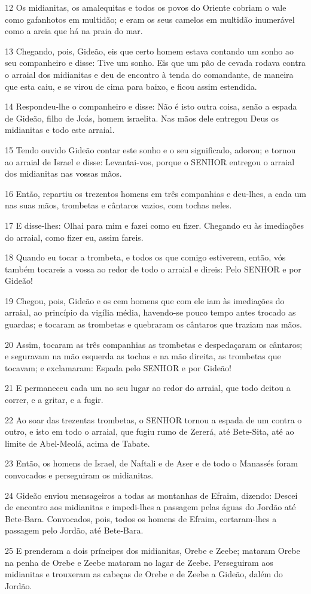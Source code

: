 \par 12 Os midianitas, os amalequitas e todos os povos do Oriente cobriam o vale como gafanhotos em multidão; e eram os seus camelos em multidão inumerável como a areia que há na praia do mar.
\par 13 Chegando, pois, Gideão, eis que certo homem estava contando um sonho ao seu companheiro e disse: Tive um sonho. Eis que um pão de cevada rodava contra o arraial dos midianitas e deu de encontro à tenda do comandante, de maneira que esta caiu, e se virou de cima para baixo, e ficou assim estendida.
\par 14 Respondeu-lhe o companheiro e disse: Não é isto outra coisa, senão a espada de Gideão, filho de Joás, homem israelita. Nas mãos dele entregou Deus os midianitas e todo este arraial.
\par 15 Tendo ouvido Gideão contar este sonho e o seu significado, adorou; e tornou ao arraial de Israel e disse: Levantai-vos, porque o SENHOR entregou o arraial dos midianitas nas vossas mãos.
\par 16 Então, repartiu os trezentos homens em três companhias e deu-lhes, a cada um nas suas mãos, trombetas e cântaros vazios, com tochas neles.
\par 17 E disse-lhes: Olhai para mim e fazei como eu fizer. Chegando eu às imediações do arraial, como fizer eu, assim fareis.
\par 18 Quando eu tocar a trombeta, e todos os que comigo estiverem, então, vós também tocareis a vossa ao redor de todo o arraial e direis: Pelo SENHOR e por Gideão!
\par 19 Chegou, pois, Gideão e os cem homens que com ele iam às imediações do arraial, ao princípio da vigília média, havendo-se pouco tempo antes trocado as guardas; e tocaram as trombetas e quebraram os cântaros que traziam nas mãos.
\par 20 Assim, tocaram as três companhias as trombetas e despedaçaram os cântaros; e seguravam na mão esquerda as tochas e na mão direita, as trombetas que tocavam; e exclamaram: Espada pelo SENHOR e por Gideão!
\par 21 E permaneceu cada um no seu lugar ao redor do arraial, que todo deitou a correr, e a gritar, e a fugir.
\par 22 Ao soar das trezentas trombetas, o SENHOR tornou a espada de um contra o outro, e isto em todo o arraial, que fugiu rumo de Zererá, até Bete-Sita, até ao limite de Abel-Meolá, acima de Tabate.
\par 23 Então, os homens de Israel, de Naftali e de Aser e de todo o Manassés foram convocados e perseguiram os midianitas.
\par 24 Gideão enviou mensageiros a todas as montanhas de Efraim, dizendo: Descei de encontro aos midianitas e impedi-lhes a passagem pelas águas do Jordão até Bete-Bara. Convocados, pois, todos os homens de Efraim, cortaram-lhes a passagem pelo Jordão, até Bete-Bara.
\par 25 E prenderam a dois príncipes dos midianitas, Orebe e Zeebe; mataram Orebe na penha de Orebe e Zeebe mataram no lagar de Zeebe. Perseguiram aos midianitas e trouxeram as cabeças de Orebe e de Zeebe a Gideão, dalém do Jordão.

